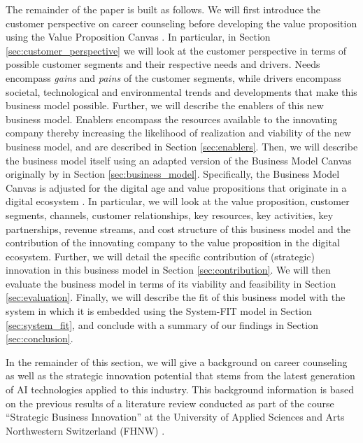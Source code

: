 The remainder of the paper is built as follows. We will first introduce the customer perspective on career counseling
before developing the value proposition using the Value Proposition Canvas \citep{osterwalderValuePropositionDesign2014}.
In particular, in Section \ref{sec:customer_perspective} we will look at the customer perspective in terms of possible
customer segments and their respective needs and drivers. Needs encompass \textit{gains} and \textit{pains} of the
customer segments, while drivers encompass societal, technological and environmental trends and developments that make
this business model possible. Further, we will describe the enablers of this new business model. Enablers encompass 
the resources available to the innovating company thereby increasing the likelihood of realization and viability of the
new business model, and are described in Section \ref{sec:enablers}. Then, we will describe the business model itself
using an adapted version of the Business Model Canvas originally by \citet{osterwalderBusinessModelGeneration2010}
in Section \ref{sec:business_model}. Specifically, the Business Model Canvas is adjusted for the digital age and
value propositions that originate in a digital ecosystem \citep[p.~193-196]{schwafertsLectureStrategicBusiness2023}.
In particular, we will look at the value proposition, customer segments, channels, customer relationships, key
resources, key activities, key partnerships, revenue streams, and cost structure of this business model and the 
contribution of the innovating company to the value proposition in the digital ecosystem.
Further, we will detail the specific contribution of (strategic) innovation in this business model in Section
\ref{sec:contribution}. We will then evaluate the business model in terms of its viability and feasibility in Section
\ref{sec:evaluation}. Finally, we will describe the fit of this business model with the system in which it is embedded
using the System-FIT model \citep{schwafertsDigitalBusinessDevelopment2020} in Section \ref{sec:system_fit}, and conclude
with a summary of our findings in Section \ref{sec:conclusion}.

In the remainder of this section, we will give a background on career counseling as well as the strategic
innovation potential that stems from the latest generation of AI technologies applied to this industry. This 
background information is based on the previous results of a literature review conducted as part of the course
``Strategic Business Innovation'' at the University of Applied Sciences and Arts Northwestern Switzerland (FHNW)
\citep{kaserAIpoweredCareerCounseling2023}.

